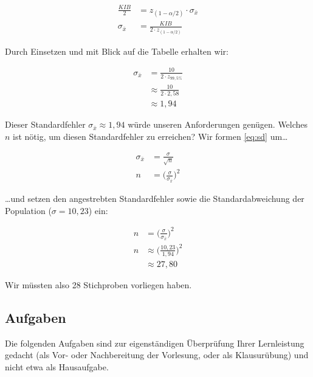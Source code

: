 \documentclass[
  ngerman,
]{article}
\begin{document}
\nopagebreak

\[\begin{aligned}
\frac{\mathit{KIB}}{2} &= z_{(1-\alpha/2)} \cdot \sigma_{\bar{x}}\\[4pt]
\sigma_{\bar{x}} &= \frac{\mathit{KIB}}{2\cdot z_{(1-\alpha/2)}} 
\end{aligned}\]

Durch Einsetzen und mit Blick auf die Tabelle erhalten wir:

\nopagebreak

\[\begin{aligned}
\sigma_{\bar{x}} &= \frac{10}{2\cdot z_{99{,}5\%}}\\[4pt]
 &\approx \frac{10}{2\cdot 2{,}58}\\[4pt]
 &\approx 1{,}94
\end{aligned}\]

Dieser Standardfehler \(\sigma_{\bar{x}}\approx1{,}94\) würde unseren Anforderungen genügen. Welches \(n\) ist nötig, um diesen Standardfehler zu erreichen? Wir formen \autoref{eq:sd} um\ldots{}

\nopagebreak

\[\begin{aligned}
\sigma_{\bar{x}} &= \frac{\sigma}{\sqrt{n}}\\[4pt]
               n &= \Big(\frac{\sigma}{\sigma_{\bar{x}}}\Big)^2
\end{aligned}\]

\ldots und setzen den angestrebten Standardfehler sowie die Standardabweichung der Population (\(\sigma=10{,}23\)) ein:

\nopagebreak

\[\begin{aligned}
n&=\Big(\frac{\sigma}{\sigma_{\bar{x}}}\Big)^2\\[4pt]
n&\approx\bigg(\frac{10{,}23}{1{,}94}\bigg)^2\\[4pt]
&\approx27{,}80
\end{aligned}\]

Wir müssten also 28 Stichproben vorliegen haben.

\hypertarget{aufgaben-3}{%
\subsection{Aufgaben}\label{aufgaben-3}}

Die folgenden Aufgaben sind zur eigenständigen Überprüfung Ihrer Lernleistung gedacht (als Vor- oder Nachbereitung der Vorlesung, oder als Klausurübung) und nicht etwa als Hausaufgabe.
\end{document}
